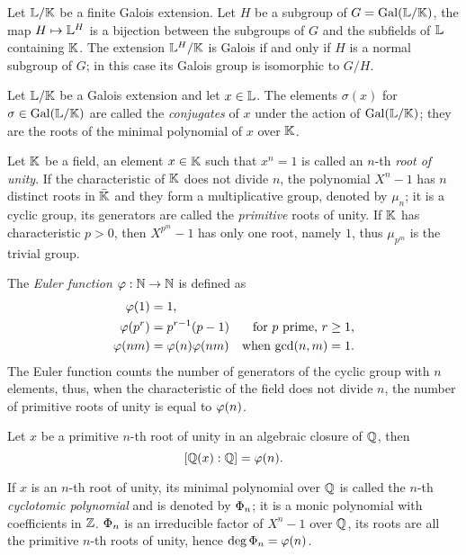 \begin{theorem}
  Let $\mathbb{L}/\mathbb{K}$ be a finite Galois extension. Let $H$ be a subgroup of
  $G=\operatorname{Gal}(\mathbb{L}/\mathbb{K})$, the map $H\mapsto \mathbb{L}^H$ is a bijection between
  the subgroups of $G$ and the subfields of $\mathbb{L}$ containing $\mathbb{K}$. The
  extension $\mathbb{L}^H/\mathbb{K}$ is Galois if and only if $H$ is a normal
  subgroup of $G$; in this case its Galois group is isomorphic to
  $G/H$.
\end{theorem}

Let $\mathbb{L}/\mathbb{K}$ be a Galois extension and let $x\in\mathbb{L}$. The elements
$\sigma(x)$ for $\sigma\in\operatorname{Gal}(\mathbb{L}/\mathbb{K})$ are called the
\emph{conjugates} of $x$ under the action
of $\operatorname{Gal}(\mathbb{L}/\mathbb{K})$; they are the roots of the minimal polynomial of $x$
over $\mathbb{K}$.

Let $\mathbb{K}$ be a field, an element $x\in \mathbb{K}$ such that $x^n=1$ is called
an $n$-th \emph{root of unity}. If the
characteristic of $\mathbb{K}$ does not divide $n$, the polynomial $X^n-1$ has
$n$ distinct roots in $\bar{\mathbb{K}}$ and they form a multiplicative
group, denoted by $\mu_n$; it is a cyclic group, its generators are called the
 \emph{primitive} roots of unity.  If
$\mathbb{K}$ has characteristic $p>0$, then $X^{p^m}-1$ has only one root,
namely $1$, thus $\mu_{p^m}$ is the trivial group.

The \emph{Euler function}
$\varphi:\mathbb{N}\rightarrow\mathbb{N}$ is
defined as
\begin{align*}
  \varphi(1) &= 1\text{,}\\
  \varphi(p^r) &= p^{r-1}(p-1) &\text{for $p$ prime, $r\ge1$,}\\
  \varphi(nm) &= \varphi(n)\varphi(nm) &\text{when $\gcd(n,m)=1$.}
\end{align*}
The Euler function counts the number of generators of the cyclic group
with $n$ elements, thus, when the characteristic of the field does not
divide $n$, the number of primitive roots of unity is equal to $\varphi(n)$.

\begin{theorem}
  Let $x$ be a primitive $n$-th root of unity in an algebraic closure
  of $\mathbb{Q}$, then
  \[[\mathbb{Q}(x):\mathbb{Q}]=\varphi(n)\text{.}\]
\end{theorem}

If $x$ is an $n$-th root of unity, its minimal polynomial over $\mathbb{Q}$ is
called the $n$-th \emph{cyclotomic
  polynomial} and is denoted by
$\Phi_n$;
it is a monic polynomial with coefficients in $\mathbb{Z}$. $\Phi_n$ is an
irreducible factor of $X^n-1$ over $\mathbb{Q}$, its roots are all the
primitive $n$-th roots of unity, hence $\deg\Phi_n=\varphi(n)$.

